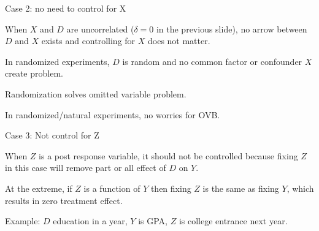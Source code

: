 \documentclass[handout]{beamer}
\begin{document}
\begin{frame}{Case 2: no need to control for X}
\begin{center}
\end{center}
When $X$ and $D$ are uncorrelated ($\delta=0$ in the previous slide), no arrow between $D$ and $X$ exists and controlling for $X$ does not matter.\medskip

In randomized experiments, $D$ is random and no common factor or confounder $X$ create problem. \bigskip

Randomization solves omitted variable problem.\medskip

In randomized/natural experiments, no worries for OVB.

\end{frame}
%
%
%
%
%
%

\begin{frame}{Case 3: Not control for Z}
\begin{center}
\end{center}

When $Z$ is a post response variable, it should not be controlled because fixing $Z$ in this case will remove part or all effect of $D$ on $Y$.\medskip

At the extreme, if $Z$ is a function of $Y$ then fixing $Z$ is the same as fixing $Y$, which results in zero treatment effect.\medskip

Example: $D$ education in a year, $Y$ is GPA, $Z$ is college entrance next year.
\end{frame}
\end{document}
